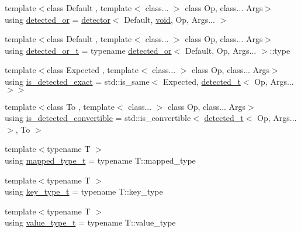 \begin{DoxyCompactItemize}
\item 
{\footnotesize template$<$class Default , template$<$ class... $>$ class Op, class... Args$>$ }\\using \hyperlink{namespacenlohmann_1_1detail_a240ce21919ab08e8a6cb3a5cfa412bce}{detected\+\_\+or} = \hyperlink{structnlohmann_1_1detail_1_1detector}{detector}$<$ Default, \hyperlink{namespacenlohmann_1_1detail_a59fca69799f6b9e366710cb9043aa77d}{void}, Op, Args... $>$
\item 
{\footnotesize template$<$class Default , template$<$ class... $>$ class Op, class... Args$>$ }\\using \hyperlink{namespacenlohmann_1_1detail_a7ac5b8ef0363101275a2827b3b117dcf}{detected\+\_\+or\+\_\+t} = typename \hyperlink{namespacenlohmann_1_1detail_a240ce21919ab08e8a6cb3a5cfa412bce}{detected\+\_\+or}$<$ Default, Op, Args... $>$\+::type
\item 
{\footnotesize template$<$class Expected , template$<$ class... $>$ class Op, class... Args$>$ }\\using \hyperlink{namespacenlohmann_1_1detail_aa5a24092e12003ae73ae457b0dd29abd}{is\+\_\+detected\+\_\+exact} = std\+::is\+\_\+same$<$ Expected, \hyperlink{namespacenlohmann_1_1detail_a37e97a32d0b94ce5f745427e4e40204d}{detected\+\_\+t}$<$ Op, Args... $>$$>$
\item 
{\footnotesize template$<$class To , template$<$ class... $>$ class Op, class... Args$>$ }\\using \hyperlink{namespacenlohmann_1_1detail_a5262e531c46e357b33007060f294673b}{is\+\_\+detected\+\_\+convertible} = std\+::is\+\_\+convertible$<$ \hyperlink{namespacenlohmann_1_1detail_a37e97a32d0b94ce5f745427e4e40204d}{detected\+\_\+t}$<$ Op, Args... $>$, To $>$
\item 
{\footnotesize template$<$typename T $>$ }\\using \hyperlink{namespacenlohmann_1_1detail_a9c1795c148875722f8482d39e0eb9364}{mapped\+\_\+type\+\_\+t} = typename T\+::mapped\+\_\+type
\item 
{\footnotesize template$<$typename T $>$ }\\using \hyperlink{namespacenlohmann_1_1detail_a66dfe39f03b05d6b7265a0ff748d64ef}{key\+\_\+type\+\_\+t} = typename T\+::key\+\_\+type
\item 
{\footnotesize template$<$typename T $>$ }\\using \hyperlink{namespacenlohmann_1_1detail_af91beae90c2fb0f931079b3d50a343bc}{value\+\_\+type\+\_\+t} = typename T\+::value\+\_\+type
\item 
$$
\end{DoxyCompactItemize}
